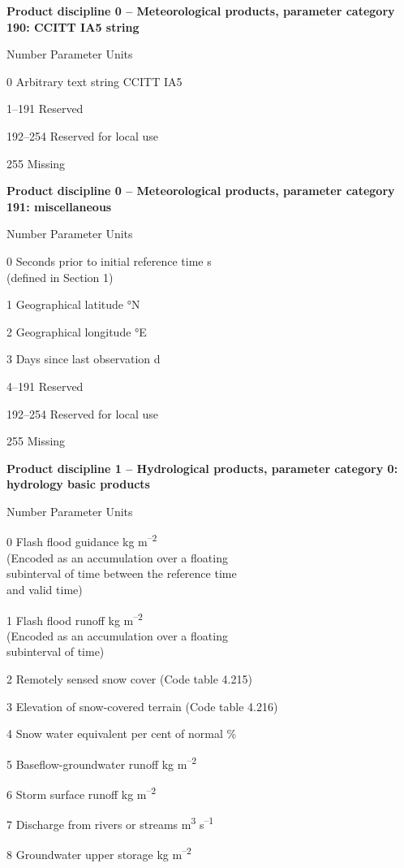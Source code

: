 \textbf{Product discipline 0 -- Meteorological products, parameter category 190: CCITT IA5 string}

Number Parameter Units

0 Arbitrary text string CCITT IA5

1--191 Reserved

192--254 Reserved for local use

255 Missing

\textbf{Product discipline 0 -- Meteorological products, parameter category 191: miscellaneous}

Number Parameter Units

0 Seconds prior to initial reference time s\\
(defined in Section 1)

1 Geographical latitude °N

2 Geographical longitude °E

3 Days since last observation d

4--191 Reserved

192--254 Reserved for local use

255 Missing

\textbf{Product discipline 1 -- Hydrological products, parameter category 0: hydrology basic products}

Number Parameter Units

0 Flash flood guidance kg m\textsuperscript{--2}\\
(Encoded as an accumulation over a floating\\
subinterval of time between the reference time\\
and valid time)

1 Flash flood runoff kg m\textsuperscript{--2}\\
(Encoded as an accumulation over a floating\\
subinterval of time)

2 Remotely sensed snow cover (Code table 4.215)

3 Elevation of snow-covered terrain (Code table 4.216)

4 Snow water equivalent per cent of normal \%

5 Baseflow-groundwater runoff kg m\textsuperscript{--2}

6 Storm surface runoff kg m\textsuperscript{--2}

7 Discharge from rivers or streams m\textsuperscript{3} s\textsuperscript{--1}

8 Groundwater upper storage kg m\textsuperscript{--2}

